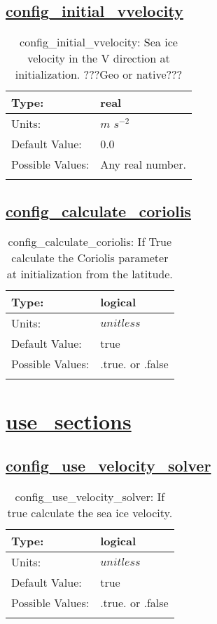 \subsection[config\_initial\_vvelocity]{\hyperref[sec:nm_tab_initialize]{config\_initial\_vvelocity}}
\label{subsec:nm_sec_config_initial_vvelocity}
\begin{center}
\begin{longtable}{| p{2.0in} || p{4.0in} |}
    \hline
    Type: & real \\
    \hline
    Units: & $m$ $s^{-2}$ \\
    \hline
    Default Value: & 0.0 \\
    \hline
    Possible Values: & Any real number. \\
    \hline
    \caption{config\_initial\_vvelocity: Sea ice velocity in the V direction at initialization. ???Geo or native???}
\end{longtable}
\end{center}
\subsection[config\_calculate\_coriolis]{\hyperref[sec:nm_tab_initialize]{config\_calculate\_coriolis}}
\label{subsec:nm_sec_config_calculate_coriolis}
\begin{center}
\begin{longtable}{| p{2.0in} || p{4.0in} |}
    \hline
    Type: & logical \\
    \hline
    Units: & $unitless$ \\
    \hline
    Default Value: & true \\
    \hline
    Possible Values: & .true. or .false \\
    \hline
    \caption{config\_calculate\_coriolis: If True calculate the Coriolis parameter at initialization from the latitude.}
\end{longtable}
\end{center}
\section[use\_sections]{\hyperref[sec:nm_tab_use_sections]{use\_sections}}
\label{sec:nm_sec_use_sections}
\subsection[config\_use\_velocity\_solver]{\hyperref[sec:nm_tab_use_sections]{config\_use\_velocity\_solver}}
\label{subsec:nm_sec_config_use_velocity_solver}
\begin{center}
\begin{longtable}{| p{2.0in} || p{4.0in} |}
    \hline
    Type: & logical \\
    \hline
    Units: & $unitless$ \\
    \hline
    Default Value: & true \\
    \hline
    Possible Values: & .true. or .false \\
    \hline
    \caption{config\_use\_velocity\_solver: If true calculate the sea ice velocity.}
\end{longtable}
\end{center}
